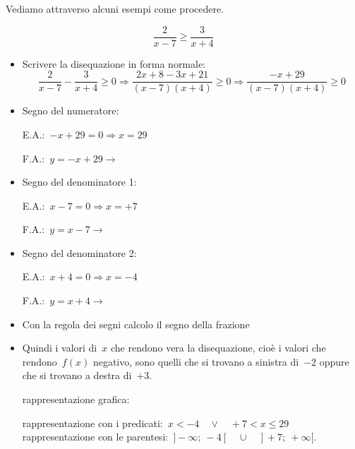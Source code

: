 Vediamo attraverso alcuni esempi come procedere.

 \begin{esempio}
\[\frac{2}{x-7} \ge \frac{3}{x+4}\]
\begin{itemize}
 \item Scrivere la disequazione in forma normale:
 \[\frac{2}{x-7} - \frac{3}{x+4} \ge 0 \Rightarrow 
   \frac{2 x +8 -3x +21}{(x-7)(x+4)} \ge 0 \Rightarrow
   \frac{-x +29}{(x-7)(x+4)} \ge 0\]
 \item Segno del numeratore:\\
 \begin{minipage}{.45\textwidth}
  E.A.:~$-x +29=0 \Rightarrow x=29$
 \end{minipage}
 \begin{minipage}{.25\textwidth}
  F.A.:~$y=-x +29 \rightarrow $
 \end{minipage}
 \begin{minipage}{.3\textwidth}
  
 \end{minipage}
 \item Segno del denominatore 1:\\
 \begin{minipage}{.45\textwidth}
  E.A.:~$x -7=0 \Rightarrow x=+7$
 \end{minipage}
 \begin{minipage}{.25\textwidth}
  F.A.:~$y=x -7 \rightarrow $
 \end{minipage}
 \begin{minipage}{.3\textwidth}
  
 \end{minipage}
 \item Segno del denominatore 2:\\
 \begin{minipage}{.45\textwidth}
  E.A.:~$x +4=0 \Rightarrow x=-4$
 \end{minipage}
 \begin{minipage}{.25\textwidth}
  F.A.:~$y=x +4 \rightarrow $
 \end{minipage}
 \begin{minipage}{.3\textwidth}
  
 \end{minipage}
 \item Con la regola dei segni calcolo il segno della frazione 
   
 \item Quindi i valori di~$x$ che rendono vera la disequazione, cioè i valori
  che rendono~$f(x)$ negativo, sono quelli 
  che si trovano a sinistra di~$-2$ oppure che si trovano a destra di~$+3$. 
 \subitem 
  \begin{minipage}{.35\textwidth}
   rappresentazione grafica: 
  \end{minipage}
  \begin{minipage}{.30\textwidth}
   
  \end{minipage}
 \subitem rappresentazione con i 
  predicati:~$x < -4 \quad \lor \quad +7 < x \le 29$ 
 \subitem rappresentazione con le 
  parentesi:~$]-\infty;~-4[ \quad \cup \quad ]+7;~+\infty[$. 
\end{itemize}
 \end{esempio}

